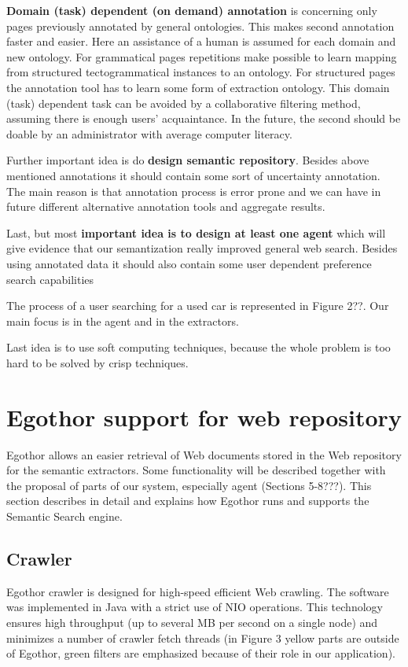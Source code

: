 \documentclass{sig-alternate}
\begin{document}
\textbf{Domain (task) dependent (on demand) annotation} is concerning only pages previously annotated by general ontologies. This makes second annotation faster and easier. Here an assistance of a human is assumed for each domain and new ontology. For grammatical pages repetitions make possible to learn mapping from structured tectogrammatical instances to an ontology. For structured pages the annotation tool has to learn some form of extraction ontology. This domain (task) dependent task can be avoided by a collaborative filtering method, assuming there is enough users' acquaintance. In the future, the second should be doable by an administrator with average computer literacy. 

Further important idea is do \textbf{design semantic repository}. Besides above mentioned annotations it should contain some sort of uncertainty annotation. The main reason is that annotation process is error prone and we can have in future different alternative annotation tools and aggregate results. 

Last, but most \textbf{important idea is to design at least one agent} which will give evidence that our semantization really improved general web search. Besides using annotated data it should also contain some user dependent preference search capabilities

 
The process of a user searching for a used car is represented in Figure 2??. Our main focus is in the agent and in the extractors. 

Last idea is to use soft computing techniques, because the whole problem is too hard to be solved by crisp techniques. 


\section{Egothor support for web repository}
Egothor allows an easier retrieval of Web documents stored in the Web repository for the semantic extractors. Some functionality will be described together with the proposal of parts of our system, especially agent (Sections 5-8???). This section describes in detail and explains how Egothor runs and supports the Semantic Search engine.

\subsection{Crawler}

Egothor crawler is designed for high-speed efficient Web crawling. The software was implemented in Java with a strict use of NIO operations. This technology ensures high throughput (up to several MB per second on a single node) and minimizes a number of crawler fetch threads (in Figure 3 yellow parts are outside of Egothor, green filters are emphasized because of their role in our application).
 
\end{document}
